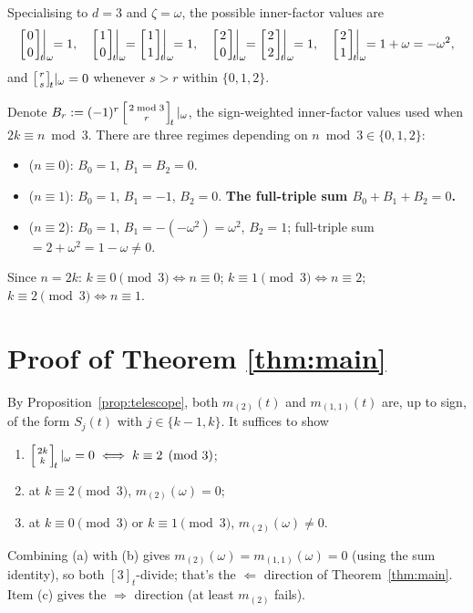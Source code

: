 \documentclass[11pt]{article}
\theoremstyle{definition}
\theoremstyle{remark}
\newcommand{\qbinom}[2]{\left[{#1 \atop #2}\right]_{\!t}}
\begin{document}
Specialising to $d = 3$ and $\zeta = \omega$, the possible inner-factor values are
\[
\qbinom{0}{0}\!\!\bigg|_\omega \!\!= 1,\quad
\qbinom{1}{0}\!\!\bigg|_\omega \!\!= \qbinom{1}{1}\!\!\bigg|_\omega \!\!= 1,\quad
\qbinom{2}{0}\!\!\bigg|_\omega \!\!= \qbinom{2}{2}\!\!\bigg|_\omega \!\!= 1,\quad
\qbinom{2}{1}\!\!\bigg|_\omega \!\!= 1 + \omega = -\omega^2,
\]
and $\qbinom{r}{s}\!|_\omega = 0$ whenever $s > r$ within $\{0, 1, 2\}$.

Denote $B_r := (-1)^r \qbinom{2 \bmod 3}{r}|_\omega$, the sign-weighted
inner-factor values used when $2k \equiv n \bmod 3$. There are three
regimes depending on $n \bmod 3 \in \{0, 1, 2\}$:

\begin{itemize}
\item ($n \equiv 0$): $B_0 = 1$, $B_1 = B_2 = 0$.
\item ($n \equiv 1$): $B_0 = 1$, $B_1 = -1$, $B_2 = 0$. \textbf{The full-triple sum $B_0 + B_1 + B_2 = 0$.}
\item ($n \equiv 2$): $B_0 = 1$, $B_1 = -(-\omega^2) = \omega^2$, $B_2 = 1$; full-triple sum $= 2 + \omega^2 = 1 - \omega \ne 0$.
\end{itemize}

Since $n = 2k$: $k \equiv 0 \pmod 3 \Leftrightarrow n \equiv 0$;
$k \equiv 1 \pmod 3 \Leftrightarrow n \equiv 2$;
$k \equiv 2 \pmod 3 \Leftrightarrow n \equiv 1$.

\section{Proof of Theorem \ref{thm:main}}

By Proposition~\ref{prop:telescope}, both $m_{(2)}(t)$ and
$m_{(1,1)}(t)$ are, up to sign, of the form $S_j(t)$ with $j \in
\{k-1, k\}$.  It suffices to show
\begin{enumerate}
\item[(a)] $\qbinom{2k}{k}|_\omega = 0 \iff k \equiv 2 \pmod 3$;
\item[(b)] at $k \equiv 2 \pmod 3$, $m_{(2)}(\omega) = 0$;
\item[(c)] at $k \equiv 0 \pmod 3$ or $k \equiv 1 \pmod 3$, $m_{(2)}(\omega) \ne 0$.
\end{enumerate}

Combining (a) with (b) gives $m_{(2)}(\omega) = m_{(1,1)}(\omega) = 0$ (using the sum identity), so both $[3]_t$-divide; that's the $\Leftarrow$ direction of Theorem~\ref{thm:main}. Item (c) gives the $\Rightarrow$ direction (at least $m_{(2)}$ fails).
\end{document}
